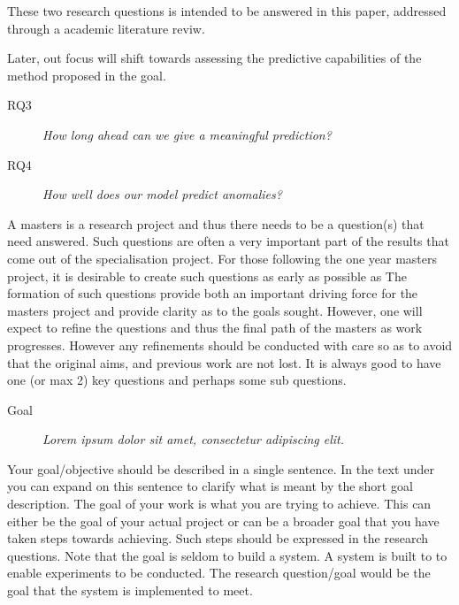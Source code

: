 These two research questions is intended to be answered in this paper, addressed through a academic literature reviw.
\newline

Later, out focus will shift towards assessing the predictive capabilities of the method proposed in the goal.

\begin{description}
    \item[RQ3]{\it How long ahead can we give a meaningful prediction?}
\end{description}

\begin{description}
    \item[RQ4]{\it How well does our model predict anomalies?}
\end{description}



\iffalse
A masters is a research project and thus there needs to be a question(s) that need answered.
Such questions are often a very important part of the results that come out of the specialisation project.
For those following the one year masters project, it is desirable to create such questions as early as possible as   The formation of such questions provide both an important driving force for the masters project and provide clarity as to the goals sought. However, one will expect to refine the questions and thus the final path of the masters as work progresses. However any refinements should be conducted with care so as to avoid that the original aims, and previous work are not lost.  
It is always good to have one (or max 2) key questions and perhaps some sub questions. 

\begin{description}
\item[Goal] {\it Lorem ipsum dolor sit amet, consectetur adipiscing elit.}
\end{description}

Your goal/objective should be described in a single sentence. In the text under you can expand on this sentence to clarify what is meant by the short goal description. 
The goal of your work is what you are trying to achieve. This can either be the goal of your actual project or can be a broader goal that you have taken steps towards achieving. Such steps should be expressed in the research questions. 
Note that the goal is seldom to build a system. A system is built to to enable experiments to be conducted. The research question/goal would be the goal that the system is implemented to meet.  


